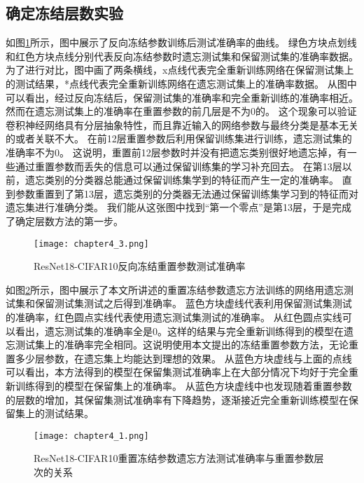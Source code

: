 \subsection{确定冻结层数实验}
如图\ref{fig:chapter4_3}所示，图中展示了反向冻结参数训练后测试准确率的曲线。
绿色方块点划线和红色方块点线分别代表反向冻结参数时遗忘测试集和保留测试集的准确率数据。
为了进行对比，图中画了两条横线，x点线代表完全重新训练网络在保留测试集上的测试结果，*点线代表完全重新训练网络在遗忘测试集上的准确率数据。
从图中可以看出，经过反向冻结后，保留测试集的准确率和完全重新训练的准确率相近。然而在遗忘测试集上的准确率在重置参数的前几层是不为0的。
这个现象可以验证卷积神经网络具有分层抽象特性，而且靠近输入的网络参数与最终分类是基本无关的或者关联不大。
在前12层重置参数后利用保留训练集进行训练，遗忘测试集的准确率不为0。
这说明，重置前12层参数时并没有把遗忘类别很好地遗忘掉，有一些通过重置参数而丢失的信息可以通过保留训练集的学习补充回去。
在第13层以前，遗忘类别的分类器总能通过保留训练集学到的特征而产生一定的准确率。
直到参数重置到了第13层，遗忘类别的分类器无法通过保留训练集学习到的特征而对遗忘集进行准确分类。
我们能从这张图中找到“第一个零点”是第13层，于是完成了确定层数方法的第一步。
\begin{figure}
    \centering
    \texttt{[image: chapter4\_3.png]}
    \caption{ResNet18-CIFAR10反向冻结重置参数测试准确率}
    \label{fig:chapter4_3}
\end{figure}

如图\ref{fig:chapter4_1}所示，图中展示了本文所讲述的重置冻结参数遗忘方法训练的网络用遗忘测试集和保留测试集测试之后得到准确率。
蓝色方块虚线代表利用保留测试集测试的准确率，红色圆点实线代表使用遗忘测试集测试的准确率。
从红色圆点实线可以看出，遗忘测试集的准确率全是0。这样的结果与完全重新训练得到的模型在遗忘测试集上的准确率完全相同。这说明使用本文提出的冻结重置参数方法，无论重置多少层参数，在遗忘集上均能达到理想的效果。
从蓝色方块虚线与上面的点线可以看出，本方法得到的模型在保留集测试准确率上在大部分情况下均好于完全重新训练得到的模型在保留集上的准确率。
从蓝色方块虚线中也发现随着重置参数的层数的增加，其保留集测试准确率有下降趋势，逐渐接近完全重新训练模型在保留集上的测试结果。
\begin{figure}
    \centering
    \texttt{[image: chapter4\_1.png]}
    \caption{ResNet18-CIFAR10重置冻结参数遗忘方法测试准确率与重置参数层次的关系}
    \label{fig:chapter4_1}
\end{figure}

